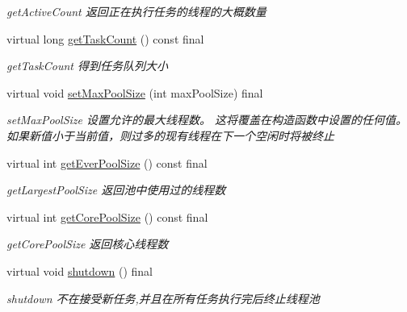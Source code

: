 \begin{DoxyCompactItemize}
\begin{DoxyCompactList}\small\item\em get\+Active\+Count 返回正在执行任务的线程的大概数量 \end{DoxyCompactList}\item 
virtual long \hyperlink{classThreadPoolExecutor_a396d50079b39787928ead5f122781de6}{get\+Task\+Count} () const final
\begin{DoxyCompactList}\small\item\em get\+Task\+Count 得到任务队列大小 \end{DoxyCompactList}\item 
virtual void \hyperlink{classThreadPoolExecutor_ac5a10d336958ca43530b31bff81c9c4b}{set\+Max\+Pool\+Size} (int max\+Pool\+Size) final
\begin{DoxyCompactList}\small\item\em set\+Max\+Pool\+Size 设置允许的最大线程数。 这将覆盖在构造函数中设置的任何值。 如果新值小于当前值，则过多的现有线程在下一个空闲时将被终止 \end{DoxyCompactList}\item 
virtual int \hyperlink{classThreadPoolExecutor_af630e5117b4f67428a4fcbee5c15a7d9}{get\+Ever\+Pool\+Size} () const final
\begin{DoxyCompactList}\small\item\em get\+Largest\+Pool\+Size 返回池中使用过的线程数 \end{DoxyCompactList}\item 
virtual int \hyperlink{classThreadPoolExecutor_af29377a50af53031bb06aeacf9ef27f7}{get\+Core\+Pool\+Size} () const final
\begin{DoxyCompactList}\small\item\em get\+Core\+Pool\+Size 返回核心线程数 \end{DoxyCompactList}\item 
\mbox{\label{classThreadPoolExecutor_aaa834c4350d6b12826803bb13dd467ea}} 
virtual void \hyperlink{classThreadPoolExecutor_aaa834c4350d6b12826803bb13dd467ea}{shutdown} () final
\begin{DoxyCompactList}\small\item\em shutdown 不在接受新任务,并且在所有任务执行完后终止线程池 \end{DoxyCompactList}\item 
\mbox{\label{classThreadPoolExecutor_a588ec33baf402afd0e1c52b11d9234da}} 

\end{DoxyCompactItemize}

